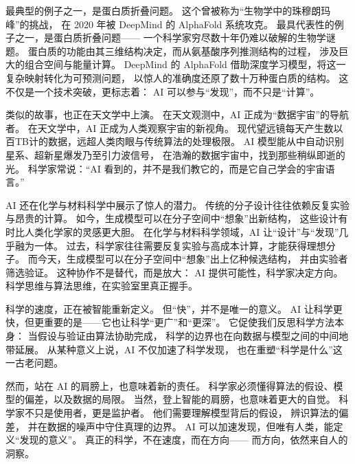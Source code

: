 最典型的例子之一，是蛋白质折叠问题。  
这个曾被称为“生物学中的珠穆朗玛峰”的挑战，  
在 2020 年被 DeepMind 的 AlphaFold 系统攻克。  
最具代表性的例子之一，是蛋白质折叠问题——  
一个科学家穷尽数十年仍难以破解的生物学谜题。  
蛋白质的功能由其三维结构决定，而从氨基酸序列推测结构的过程，  
涉及巨大的组合空间与能量计算。  
DeepMind 的 AlphaFold 借助深度学习模型，将这一复杂映射转化为可预测问题，  
以惊人的准确度还原了数十万种蛋白质的结构。  
这不仅是一个技术突破，更标志着：  
AI 可以参与“发现”，而不只是“计算”。

类似的故事，也正在天文学中上演。  
在天文观测中，AI 正成为“数据宇宙”的导航者。  
在天文学中，AI 正成为人类观察宇宙的新视角。  
现代望远镜每天产生数以百TB计的数据，远超人类肉眼与传统算法的处理极限。  
AI 模型能从中自动识别星系、超新星爆发乃至引力波信号，  
在浩瀚的数据宇宙中，找到那些稍纵即逝的光。  
科学家常说：“AI 看到的，并不是我们教它的，而是它自己学会的宇宙语言。”

AI 还在化学与材料科学中展示了惊人的潜力。  
传统的分子设计往往依赖反复实验与昂贵的计算。  
如今，生成模型可以在分子空间中“想象”出新结构，  
这些设计有时比人类化学家的灵感更大胆。  
在化学与材料科学领域，AI 让“设计”与“发现”几乎融为一体。  
过去，科学家往往需要反复实验与高成本计算，才能获得理想分子。  
而今天，生成模型可以在分子空间中“想象”出上亿种候选结构，  
并由实验者筛选验证。  
这种协作不是替代，而是放大：  
AI 提供可能性，科学家决定方向。  
科学思维与算法思维，在实验室里真正握手。

科学的速度，正在被智能重新定义。  
但“快”，并不是唯一的意义。  
AI 让科学更快，但更重要的是——它也让科学“更广”和“更深”。  
它促使我们反思科学方法本身：  
当假设与验证由算法协助完成，  
科学的边界也在向数据与模型之间的中间地带延展。  
从某种意义上说，AI 不仅加速了科学发现，  
也在重塑“科学是什么”这一古老问题。

然而，站在 AI 的肩膀上，也意味着新的责任。  
科学家必须懂得算法的假设、模型的偏差，以及数据的局限。  
当然，登上智能的肩膀，也意味着更大的自觉。  
科学家不只是使用者，更是监护者。  
他们需要理解模型背后的假设，  
辨识算法的偏差，  
并在数据的噪声中守住真理的边界。  
AI 可以加速发现，但唯有人类，能定义“发现的意义”。  
真正的科学，不在速度，而在方向——  
而方向，依然来自人的洞察。

